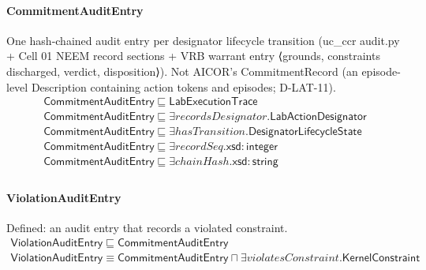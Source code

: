 \documentclass[10pt]{article}
\begin{document}
\paragraph{CommitmentAuditEntry} One hash-chained audit entry per designator lifecycle transition (uc\_ccr audit.py + Cell 01 NEEM record sections + VRB warrant entry ⟨grounds, constraints discharged, verdict, disposition⟩). Not AICOR's CommitmentRecord (an episode-level Description containing action tokens and episodes; D-LAT-11).
\[\begin{array}{l}
\mathsf{CommitmentAuditEntry} \sqsubseteq  \mathsf{LabExecutionTrace} \\
\mathsf{CommitmentAuditEntry} \sqsubseteq  \exists \mathit{recordsDesignator}.\mathsf{LabActionDesignator} \\
\mathsf{CommitmentAuditEntry} \sqsubseteq  \exists \mathit{hasTransition}.\mathsf{DesignatorLifecycleState} \\
\mathsf{CommitmentAuditEntry} \sqsubseteq  \exists \mathit{recordSeq}.\mathsf{xsd{:}integer} \\
\mathsf{CommitmentAuditEntry} \sqsubseteq  \exists \mathit{chainHash}.\mathsf{xsd{:}string} \\
\end{array}\]
\paragraph{ViolationAuditEntry} Defined: an audit entry that records a violated constraint.
\[\begin{array}{l}
\mathsf{ViolationAuditEntry} \sqsubseteq  \mathsf{CommitmentAuditEntry} \\
\mathsf{ViolationAuditEntry} \equiv  \mathsf{CommitmentAuditEntry} \sqcap  \exists \mathit{violatesConstraint}.\mathsf{KernelConstraint} \\
\end{array}\]
\end{document}
